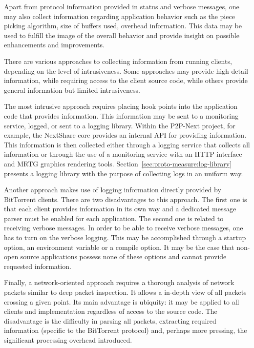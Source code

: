 Apart from protocol information provided in status and verbose messages, one
may also collect information regarding application behavior such as the piece
picking algorithm, size of buffers used, overhead information. This data may
be used to fulfill the image of the overall behavior and provide insight on
possible enhancements and improvements.

There are various approaches to collecting information from running clients,
depending on the level of intrusiveness. Some approaches may provide high
detail information, while requiring access to the client source code, while
others provide general information but limited intrusiveness.

The most intrusive approach requires placing hook points into the application
code that provides information. This information may be sent to a monitoring
service, logged, or sent to a logging library. Within the P2P-Next project,
for example, the NextShare core provides an internal API for providing
information. This information is then collected either through a logging
service that collects all information or through the use of a monitoring
service with an HTTP interface and MRTG graphics rendering tools.
Section~\ref{sec:proto-measure:log-library} presents a logging library with
the purpose of collecting logs in an uniform way.

Another approach makes use of logging information directly provided by
BitTorrent clients. There are two disadvantages to this approach. The first
one is that each client provides information in its own way and a dedicated
message parser must be enabled for each application. The second one is related
to receiving verbose messages. In order to be able to receive verbose
messages, one has to turn on the verbose logging. This may be accomplished
through a startup option, an environment variable or a compile option. It may
be the case that non-open source applications possess none of these options and
cannot provide requested information.

Finally, a network-oriented approach requires a thorough analysis of network
packets similar to deep packet inspection. It allows a in-depth view of all
packets crossing a given point. Its main advantage is ubiquity: it may be
applied to all clients and implementation regardless of access to the source
code. The disadvantage is the difficulty in parsing all packets, extracting
required information (specific to the BitTorrent protocol) and, perhaps more
pressing, the significant processing overhead introduced.

